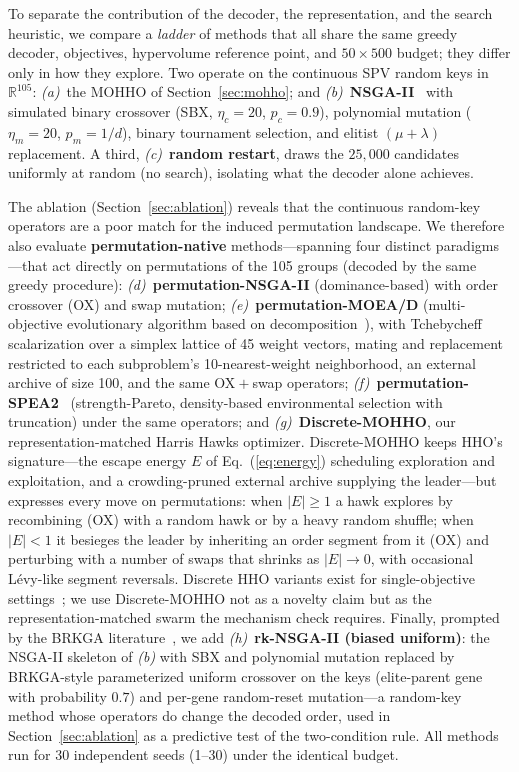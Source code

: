\documentclass[runningheads]{llncs}
\begin{document}
To separate the contribution of the decoder, the representation, and the search heuristic, we compare a \emph{ladder} of methods that all share the same greedy decoder, objectives, hypervolume reference point, and $50\times500$ budget; they differ only in how they explore. Two operate on the continuous SPV random keys in $\mathbb{R}^{105}$:
\emph{(a)}~the MOHHO of Section~\ref{sec:mohho}; and
\emph{(b)}~\textbf{NSGA-II}~\cite{deb} with simulated binary crossover (SBX, $\eta_c=20$, $p_c=0.9$), polynomial mutation ($\eta_m=20$, $p_m=1/d$), binary tournament selection, and elitist $(\mu+\lambda)$ replacement.
A third, \emph{(c)}~\textbf{random restart}, draws the $25{,}000$ candidates uniformly at random (no search), isolating what the decoder alone achieves.

The ablation (Section~\ref{sec:ablation}) reveals that the continuous random-key operators are a poor match for the induced permutation landscape. We therefore also evaluate \textbf{permutation-native} methods---spanning four distinct paradigms---that act directly on permutations of the 105 groups (decoded by the same greedy procedure): \emph{(d)}~\textbf{permutation-NSGA-II} (dominance-based) with order crossover (OX) and swap mutation; \emph{(e)}~\textbf{permutation-MOEA/D} (multi-objective evolutionary algorithm based on decomposition~\cite{zhangli}), with Tchebycheff scalarization over a simplex lattice of 45 weight vectors, mating and replacement restricted to each subproblem's 10-nearest-weight neighborhood, an external archive of size 100, and the same OX${}+{}$swap operators; \emph{(f)}~\textbf{permutation-SPEA2}~\cite{spea2} (strength-Pareto, density-based environmental selection with truncation) under the same operators; and \emph{(g)}~\textbf{Discrete-MOHHO}, our representation-matched Harris Hawks optimizer. Discrete-MOHHO keeps HHO's signature---the escape energy $E$ of Eq.~(\ref{eq:energy}) scheduling exploration and exploitation, and a crowding-pruned external archive supplying the leader---but expresses every move on permutations: when $|E|\!\ge\!1$ a hawk explores by recombining (OX) with a random hawk or by a heavy random shuffle; when $|E|\!<\!1$ it besieges the leader by inheriting an order segment from it (OX) and perturbing with a number of swaps that shrinks as $|E|\to0$, with occasional Lévy-like segment reversals. Discrete HHO variants exist for single-objective settings~\cite{gezici}; we use Discrete-MOHHO not as a novelty claim but as the representation-matched swarm the mechanism check requires. Finally, prompted by the BRKGA literature~\cite{goncalves}, we add \emph{(h)}~\textbf{rk-NSGA-II (biased uniform)}: the NSGA-II skeleton of \emph{(b)} with SBX and polynomial mutation replaced by BRKGA-style parameterized uniform crossover on the keys (elite-parent gene with probability $0.7$) and per-gene random-reset mutation---a random-key method whose operators do change the decoded order, used in Section~\ref{sec:ablation} as a predictive test of the two-condition rule. All methods run for 30 independent seeds (1--30) under the identical budget.
\end{document}
